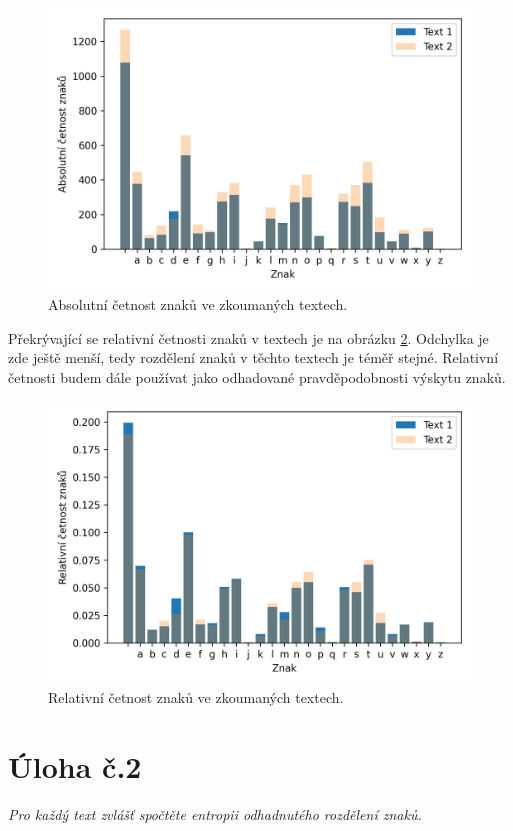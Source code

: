\documentclass[czech]{mvi-report}
\begin{document}
\begin{figure}[ht!]
\includegraphics[width=\columnwidth]{aprob1.png}
\caption{Absolutní četnost znaků ve zkoumaných textech.}
\label{fig:aprob}
\end{figure}

Překrývající se relativní četnosti znaků v textech je na obrázku \ref{fig:rprob}. Odchylka je zde ještě menší, tedy rozdělení znaků v těchto textech je téměř stejné. Relativní četnosti budem dále používat jako odhadované pravděpodobnosti výskytu znaků.

\begin{figure}[ht!]
\includegraphics[width=\columnwidth]{rprob1.png}
\caption{Relativní četnost znaků ve zkoumaných textech.}
\label{fig:rprob}
\end{figure}

\section{Úloha č.2}
\textit{Pro každý text zvlášť spočtěte entropii odhadnutého rozdělení znaků.}\\
\end{document}
